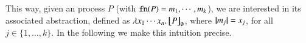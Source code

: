 \smallskip 

\noi This way, given an \HO
 process $P$ (with $\mathtt{fn}(P) = m_1, \cdots, m_k$),
 we are interested in its associated abstraction, 
defined as
$\lambda x_1\cdots x_n.\,\big\lfloor\!\!\big\lfloor P\big\rfloor\!\!\big\rfloor^{}_\emptyset$, where $|\!|m_j|\!| = x_j$, for all $j \in \{1, \ldots, k\}$. 
In the following we make this intuition precise.


